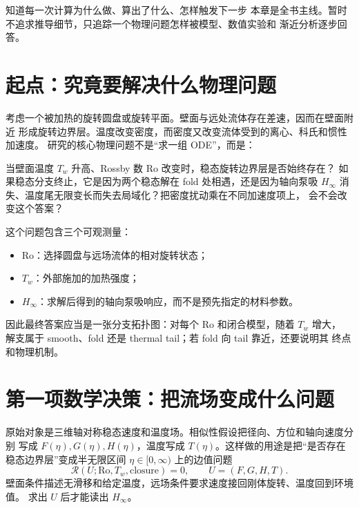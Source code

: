 \documentclass[UTF8,zihao=-4,openany]{ctexbook}
\newcommand{\Ro}{\mathrm{Ro}}
\newcommand{\R}{\mathcal R}
\begin{document}
\begin{learninggoal}{知道每一次计算为什么做、算出了什么、怎样触发下一步}
本章是全书主线。暂时不追求推导细节，只追踪一个物理问题怎样被模型、数值实验和
渐近分析逐步回答。
\end{learninggoal}

\section{起点：究竟要解决什么物理问题}

考虑一个被加热的旋转圆盘或旋转平面。壁面与远处流体存在差速，因而在壁面附近
形成旋转边界层。温度改变密度，而密度又改变流体受到的离心、科氏和惯性加速度。
研究的核心物理问题不是“求一组 ODE”，而是：

\begin{keyresult}[：本项目的物理问题]
当壁面温度 $T_w$ 升高、Rossby 数 $\Ro$ 改变时，稳态旋转边界层是否始终存在？
如果稳态分支终止，它是因为两个稳态解在 fold 处相遇，还是因为轴向泵吸
$H_\infty$ 消失、温度尾无限变长而失去局域化？把密度扰动乘在不同加速度项上，
会不会改变这个答案？
\end{keyresult}

这个问题包含三个可观测量：
\begin{itemize}
  \item $\Ro$：选择圆盘与远场流体的相对旋转状态；
  \item $T_w$：外部施加的加热强度；
  \item $H_\infty$：求解后得到的轴向泵吸响应，而不是预先指定的材料参数。
\end{itemize}
因此最终答案应当是一张分支拓扑图：对每个 $\Ro$ 和闭合模型，随着 $T_w$ 增大，
解支属于 smooth、fold 还是 thermal tail；若 fold 向 tail 靠近，还要说明其
终点和物理机制。

\section{第一项数学决策：把流场变成什么问题}

原始对象是三维轴对称稳态速度和温度场。相似性假设把径向、方位和轴向速度分别
写成 $F(\eta),G(\eta),H(\eta)$，温度写成 $T(\eta)$。这样做的用途是把“是否存在
稳态边界层”变成半无限区间 $\eta\in[0,\infty)$ 上的边值问题
\begin{equation}
 \R(U;\Ro,T_w,\text{closure})=0,\qquad U=(F,G,H,T).
\end{equation}
壁面条件描述无滑移和给定温度，远场条件要求速度接回刚体旋转、温度回到环境值。
求出 $U$ 后才能读出 $H_\infty$。
\end{document}
